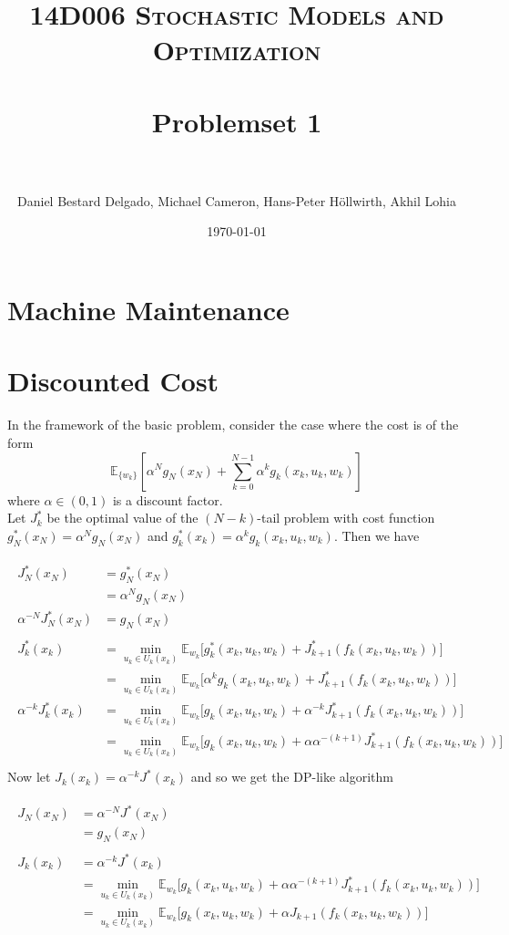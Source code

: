 \documentclass[11pt, oneside]{article}   	%
\title{	
\normalfont \normalsize 
\textsc{14D006 Stochastic Models and Optimization} \\ [25pt] %
\horrule{0.5pt} \\[0.4cm] %
\huge Problemset 1\\ %
\horrule{2pt} \\[0.5cm] %
}
\author{Daniel Bestard Delgado, Michael Cameron, Hans-Peter H{\"o}llwirth, Akhil Lohia} %
\date{\normalsize\today} %
\begin{document}
\maketitle


\section{Machine Maintenance}


\section{Discounted Cost}
In the framework of the basic problem, consider the case where the cost is of the form $$\mathbb{E}_{\{w_k\}}[\alpha^N g_N(x_N) + \sum_{k=0}^{N-1} \alpha^k g_k(x_k, u_k, w_k)]$$ where $\alpha \in (0,1)$ is a discount factor. \\

Let $J^{*}_{k}$ be the optimal value of the $(N-k)$-tail problem with cost function $g^{*}_N (x_N) = \alpha^N g_N(x_N)$ and $g^{*}_k (x_k) = \alpha^k g_k(x_k, u_k, w_k)$. Then we have

\begin{align} 
\begin{split}
J^{*}_N(x_N) &= g^{*}_N (x_N)\\ 
&= \alpha^N g_N(x_N)\\
\alpha^{-N} J^{*}_N(x_N) &= g_N(x_N)\\
\\
J^{*}_k(x_k) &= \min_{u_k \in U_k(x_k)} \mathbb{E}_{w_k} \big[g^{*}_k(x_k, u_k, w_k) + J^{*}_{k+1}(f_k(x_k, u_k, w_k))\big]\\
&= \min_{u_k \in U_k(x_k)} \mathbb{E}_{w_k} \big[\alpha^k g_k(x_k, u_k, w_k) + J^{*}_{k+1}(f_k(x_k, u_k, w_k))\big]\\
\alpha^{-k} J^{*}_k(x_k) &= \min_{u_k \in U_k(x_k)} \mathbb{E}_{w_k} \big[g_k(x_k, u_k, w_k) + \alpha^{-k} J^{*}_{k+1}(f_k(x_k, u_k, w_k))\big]\\
&= \min_{u_k \in U_k(x_k)} \mathbb{E}_{w_k} \big[g_k(x_k, u_k, w_k) + \alpha \alpha^{-(k+1)} J^{*}_{k+1}(f_k(x_k, u_k, w_k))\big]\\
\end{split}					
\end{align} 
Now let $J_k(x_k) = \alpha^{-k} J^{*} (x_k)$ and so we get the DP-like algorithm

\begin{align} 
\begin{split}
J_N(x_N) &= \alpha^{-N} J^{*}(x_N)\\
&= g_N(x_N)\\
\\
J_k(x_k)&= \alpha^{-k} J^{*}(x_k)\\
&= \min_{u_k \in U_k(x_k)} \mathbb{E}_{w_k} \big[g_k(x_k, u_k, w_k) + \alpha \alpha^{-(k+1)} J^{*}_{k+1}(f_k(x_k, u_k, w_k))\big]\\
&= \min_{u_k \in U_k(x_k)} \mathbb{E}_{w_k} \big[g_k(x_k, u_k, w_k) + \alpha J_{k+1}(f_k(x_k, u_k, w_k))\big]\\
\end{split}					
\end{align} 
\end{document}

